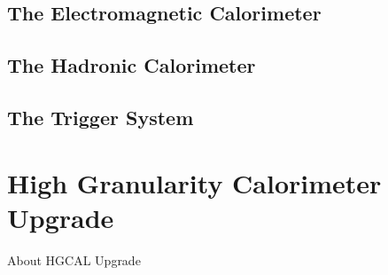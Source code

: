 \subsection{
  The Electromagnetic Calorimeter
}

\subsection{
  The Hadronic Calorimeter
}

\subsection{
  The Trigger System
}

\section{
  High Granularity Calorimeter Upgrade
 }

About \gls{HGCAL} Upgrade
